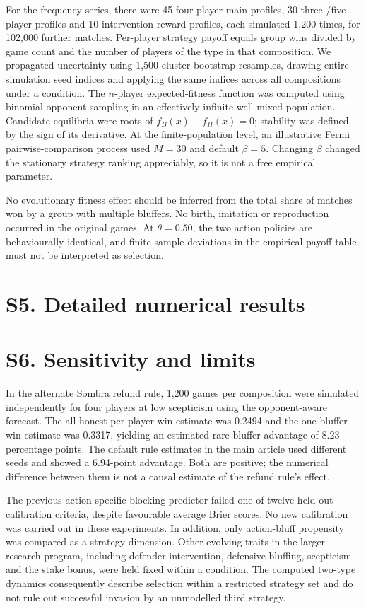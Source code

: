 \documentclass[10pt,a4paper]{article}
\begin{document}
For the frequency series, there were 45 four-player main profiles, 30 three-/five-player profiles and 10 intervention-reward profiles, each simulated 1,200 times, for 102,000 further matches. Per-player strategy payoff equals group wins divided by game count and the number of players of the type in that composition. We propagated uncertainty using 1,500 cluster bootstrap resamples, drawing entire simulation seed indices and applying the same indices across all compositions under a condition. The $n$-player expected-fitness function was computed using binomial opponent sampling in an effectively infinite well-mixed population. Candidate equilibria were roots of $f_B(x)-f_H(x)=0$; stability was defined by the sign of its derivative. At the finite-population level, an illustrative Fermi pairwise-comparison process used $M=30$ and default $\beta=5$. Changing $\beta$ changed the stationary strategy ranking appreciably, so it is not a free empirical parameter.

No evolutionary fitness effect should be inferred from the total share of matches won by a group with multiple bluffers. No birth, imitation or reproduction occurred in the original games. At $\theta=0.50$, the two action policies are behaviourally identical, and finite-sample deviations in the empirical payoff table must not be interpreted as selection.

\clearpage
\section*{S5. Detailed numerical results}

\FloatBarrier

\section*{S6. Sensitivity and limits}
In the alternate Sombra refund rule, 1,200 games per composition were simulated independently for four players at low scepticism using the opponent-aware forecast. The all-honest per-player win estimate was 0.2494 and the one-bluffer win estimate was 0.3317, yielding an estimated rare-bluffer advantage of 8.23 percentage points. The default rule estimates in the main article used different seeds and showed a 6.94-point advantage. Both are positive; the numerical difference between them is not a causal estimate of the refund rule's effect.

The previous action-specific blocking predictor failed one of twelve held-out calibration criteria, despite favourable average Brier scores. No new calibration was carried out in these experiments. In addition, only action-bluff propensity was compared as a strategy dimension. Other evolving traits in the larger research program, including defender intervention, defensive bluffing, scepticism and the stake bonus, were held fixed within a condition. The computed two-type dynamics consequently describe selection within a restricted strategy set and do not rule out successful invasion by an unmodelled third strategy.
\end{document}
